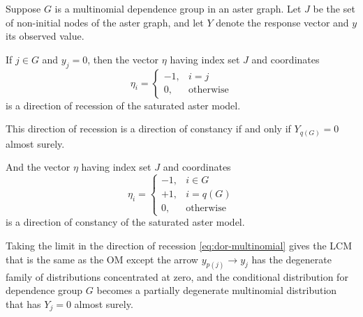 \begin{theorem} \label{th:dor-multinomial}
Suppose $G$ is a multinomial dependence group in an aster graph.
Let $J$ be the set of non-initial nodes of the aster graph,
and let $Y$ denote the response vector and $y$ its observed value.

If $j \in G$ and $y_j = 0$, then the vector $\eta$ having index set $J$
and coordinates
\begin{equation} \label{eq:dor-multinomial}
   \eta_i = \begin{cases} -1, & i = j \\
   0, & \text{otherwise} \end{cases}
\end{equation}
is a direction of recession of the saturated aster model.

This direction of recession is a direction of constancy if and only if
$Y_{q(G)} = 0$ almost surely.

And the vector $\eta$ having index set $J$ and coordinates
\begin{equation} \label{eq:doc-multinomial}
   \eta_i = \begin{cases} -1, & i \in G \\
   +1, & i = q(G) \\
   0, & \text{otherwise} \end{cases}
\end{equation}
is a direction of constancy of the saturated aster model.

Taking the limit in the direction of recession \eqref{eq:dor-multinomial}
gives the LCM that is the same as the OM except the arrow
$y_{p(j)} \longrightarrow y_j$ has the degenerate family of distributions
concentrated at zero, and the conditional distribution for dependence group
$G$ becomes a partially degenerate multinomial distribution that has
$Y_j = 0$ almost surely.
\end{theorem}
